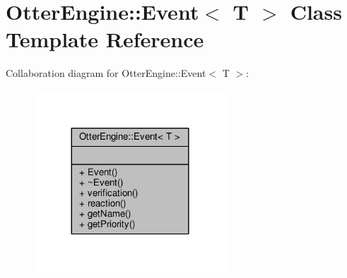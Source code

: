 \hypertarget{class_otter_engine_1_1_event}{}\section{Otter\+Engine\+:\+:Event$<$ T $>$ Class Template Reference}
\label{class_otter_engine_1_1_event}


Collaboration diagram for Otter\+Engine\+:\+:Event$<$ T $>$\+:\nopagebreak
\begin{figure}[H]
\begin{center}
\leavevmode
\includegraphics[width=204pt]{dd/d0b/class_otter_engine_1_1_event__coll__graph}
\end{center}
\end{figure}
